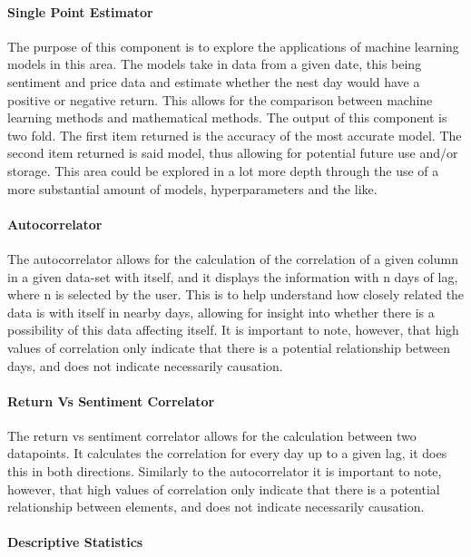 \paragraph{Single Point Estimator}

The purpose of this component is to explore the applications of machine learning models in this area. The models take in data from a given date, this being sentiment and price data and estimate whether the nest day would have a positive or negative return. This allows for the comparison between machine learning methods and mathematical methods. The output of this component is two fold. The first item returned is the accuracy of the most accurate model. The second item returned is said model, thus allowing for potential future use and/or storage. This area could be explored in a lot more depth through the use of a more substantial amount of models, hyperparameters and the like.

\paragraph{Autocorrelator}

The autocorrelator allows for the calculation of the correlation of a given column in a given data-set with itself, and it displays the information with n days of lag, where n is selected by the user. This is to help understand how closely related the data is with itself in nearby days, allowing for insight into whether there is a possibility of this data affecting itself. It is important to note, however, that high values of correlation only indicate that there is a potential relationship between days, and does not indicate necessarily causation.

\paragraph{Return Vs Sentiment Correlator}

The return vs sentiment correlator allows for the calculation between two datapoints. It calculates the correlation for every day up to a given lag, it does this in both directions. Similarly to the autocorrelator it is important to note, however, that high values of correlation only indicate that there is a potential relationship between elements, and does not indicate necessarily causation.

\paragraph{Descriptive Statistics}

